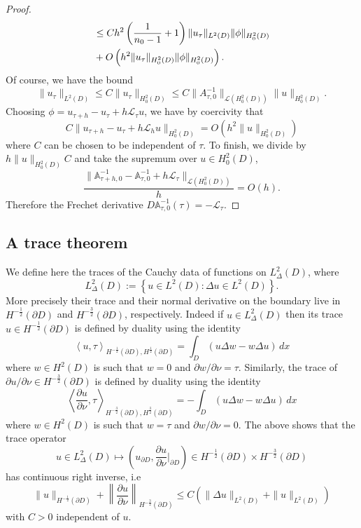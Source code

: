 \documentclass[12pt]{article}
\begin{document}
\begin{proof}
\begin{align}
&\leq C h^2  \left( \frac{1}{n_0-1}+1 \right ) \|u_\tau\|_{L^2(D)} \|\phi\|_{H^2_0(D)}\notag \\
&+O\left (h^2\|u_\tau\|_{H^2_0(D)}\|\phi\|_{H^2_0(D)}\right ).
\end{align}
Of course, we have the bound
\begin{equation}
\|u_\tau\|_{L^2(D)} \leq C \| u_\tau \|_{H^2_0(D)} \leq C \| A^{-1}_{\tau,0}\|_{\mathcal{L}(H^2_0(D))} \|u \|_{H^2_0(D)}.
\end{equation}
Choosing $\phi= u_{\tau+h}-u_\tau +h {\mathcal L}_\tau u$, we have by coercivity that
\begin{equation}
C \|u_{\tau+h}-u_\tau +h {\mathcal L}_h u\|_{H^2_0(D)}=O\left (h^2\|u\|_{H^2_0(D)}\right )
\end{equation}
where $C$ can be chosen to be independent of $\tau$.
To finish, we divide by $h\|u\|_{H^2_0(D)}C$ and take the supremum over $u\in H^2_0(D)$,
\begin{equation}
\frac{
\| \mathbb{A}^{-1}_{\tau+h,0} - \mathbb{A}^{-1}_{\tau,0} + h {\mathcal L}_\tau \|_{\mathcal{L}(H^2_0(D))}}{h} = O(h).
\end{equation}
Therefore the Frechet derivative $D\mathbb{A}^{-1}_{\tau,0}(\tau) =  -{\mathcal L}_\tau$.
\end{proof}
\subsection{A trace theorem}\label{trace}
We define here the traces of the Cauchy data  of functions on $L_\Delta^2(D)$, where
 $$L^2_{\Delta}(D):=\left\{u\in L^2(D): \Delta u\in L^2(D)\right\}.$$
More precisely their trace and their normal derivative on the boundary live in $H^{-{\frac{1}{2}}}({\partial D})$ and $H^{-{\frac{3}{2}}}({\partial D})$, respectively.  Indeed if $u\in L^2_{\Delta}(D)$ then its trace  $u\in H^{-{\frac{1}{2}}}(\partial D)$ is defined  by duality using the identity
 $$\left<u,\tau\right>_{H^{-{\frac{1}{2}}}(\partial D), H^{{\frac{1}{2}}}(\partial D)}=\int_D\left(u\Delta w-w\Delta u\right)\,dx$$
 where $w\in H^2(D)$ is such that $w=0$ and $\partial w/\partial \nu=\tau$. Similarly, the trace of $\partial u/\partial \nu\in H^{-{\frac{3}{2}}}(\partial D)$ is defined  by duality using the identity
 $$\displaystyle{\left<\frac{\partial u}{\partial \nu},\tau\right>_{H^{-{\frac{3}{2}}}(\partial D), H^{{\frac{3}{2}}}(\partial D)}=-\int_D\left(u\Delta w-w\Delta u\right)\,dx}$$
 where $w\in H^2(D)$  is such that $w=\tau$ and $\partial w/\partial \nu=0$. The above shows that the trace operator
 $$u\in L_\Delta^2(D)\mapsto \left(u_{\partial D}, \frac{\partial u}{\partial \nu}|_{\partial D}\right)\in H^{-{\frac{1}{2}}}({\partial D})\times H^{-{\frac{3}{2}}}({\partial D})$$
 has continuous right inverse, i.e
 $$\|u\|_{H^{-{\frac{1}{2}}}({\partial D})}+\left\|\frac{\partial u}{\partial \nu}\right\|_{H^{-{\frac{3}{2}}}({\partial D})}\leq C\left(\|\Delta u\|_{L^2(D)}+\|u\|_{L^2(D)}\right)$$
 with $C>0$ independent of $u$.
\end{document}
